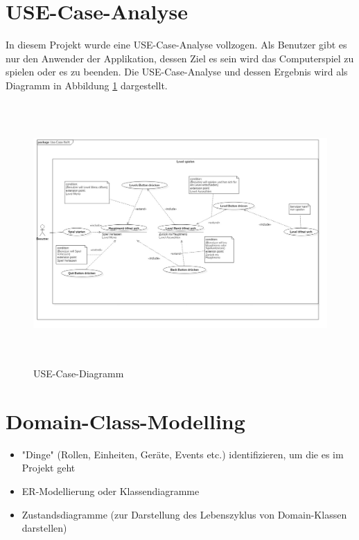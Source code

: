 \section{USE-Case-Analyse}
In diesem Projekt wurde eine USE-Case-Analyse vollzogen. Als Benutzer gibt es nur den Anwender der Applikation, dessen Ziel es sein wird das Computerspiel zu spielen oder es zu beenden. Die USE-Case-Analyse und dessen Ergebnis wird als Diagramm in Abbildung \ref{USE-Case-Diagramm} dargestellt.
\begin{figure}[H]
	\centering
	\includegraphics[width=17.5cm,height=10cm]{images/UseCaseDiagram.jpg}
	\caption{USE-Case-Diagramm}
	\label{USE-Case-Diagramm}
\end{figure}
\section{Domain-Class-Modelling}
\begin{itemize}
	\item "Dinge" (Rollen, Einheiten, Geräte, Events etc.) identifizieren, um die es im Projekt geht
	\item ER-Modellierung oder Klassendiagramme
	\item Zustandsdiagramme (zur Darstellung des Lebenszyklus von Domain-Klassen darstellen)
\end{itemize}

